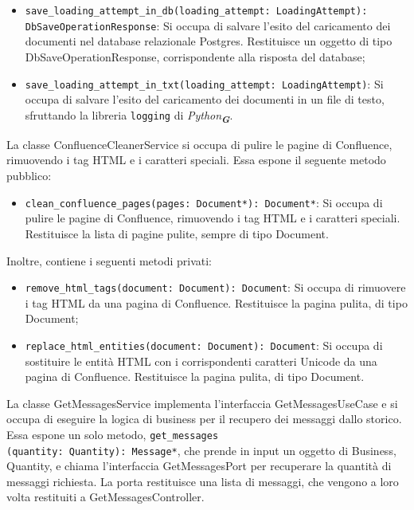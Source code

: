 \begin{itemize}
    \item \texttt{save\_loading\_attempt\_in\_db(loading\_attempt: LoadingAttempt):\\ DbSaveOperationResponse}: Si occupa di salvare l'esito del caricamento dei documenti nel database relazionale Postgres. Restituisce un oggetto di tipo DbSaveOperationResponse, corrispondente alla risposta del database;
    \item \texttt{save\_loading\_attempt\_in\_txt(loading\_attempt: LoadingAttempt)}: Si occupa di salvare l'esito del caricamento dei documenti in un file di testo, sfruttando la libreria \texttt{logging} di \emph{Python}\textsubscript{\textbf{\textit{G}}}.
\end{itemize}

\label{sec:confluence_cleaner_service}
La classe ConfluenceCleanerService si occupa di pulire le pagine di Confluence, rimuovendo i tag HTML e i caratteri speciali. Essa espone il seguente metodo pubblico:
\begin{itemize}
    \item \texttt{clean\_confluence\_pages(pages: Document*): Document*}: Si occupa di pulire le pagine di Confluence, rimuovendo i tag HTML e i caratteri speciali. Restituisce la lista di pagine pulite, sempre di tipo Document.
\end{itemize}
Inoltre, contiene i seguenti metodi privati:
\begin{itemize}
    \item \texttt{remove\_html\_tags(document: Document): Document}: Si occupa di rimuovere i tag HTML da una pagina di Confluence. Restituisce la pagina pulita, di tipo Document;
    \item \texttt{replace\_html\_entities(document: Document): Document}: Si occupa di sostituire le entità HTML con i corrispondenti caratteri Unicode da una pagina di Confluence. Restituisce la pagina pulita, di tipo Document.
\end{itemize}

\label{sec:get_messages_service}
La classe GetMessagesService implementa l'interfaccia GetMessagesUseCase e si occupa di eseguire la logica di business per il recupero dei messaggi dallo storico. Essa espone un solo metodo, \texttt{get\_messages\\(quantity: Quantity): Message*}, che prende in input un oggetto di Business, Quantity, e chiama l'interfaccia GetMessagesPort per recuperare la quantità di messaggi richiesta. La porta restituisce una lista di messaggi, che vengono a loro volta restituiti a GetMessagesController.

